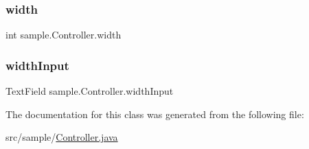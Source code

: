 \mbox{\label{classsample_1_1_controller_a2f7eab44e045182aabcf2d09c6a382ae}} 
\subsubsection{\texorpdfstring{width}{width}}
{\footnotesize\ttfamily int sample.\+Controller.\+width\hspace{0.3cm}{\ttfamily [private]}}

\mbox{\label{classsample_1_1_controller_ad9880682037a42f6599d159c05c7c20b}} 
\subsubsection{\texorpdfstring{width\+Input}{widthInput}}
{\footnotesize\ttfamily Text\+Field sample.\+Controller.\+width\+Input}



The documentation for this class was generated from the following file\+:\begin{DoxyCompactItemize}
\item 
src/sample/\mbox{\hyperlink{_controller_8java}{Controller.\+java}}\end{DoxyCompactItemize}
